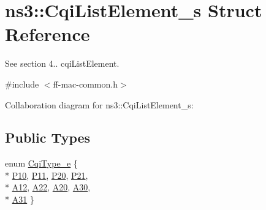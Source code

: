 \hypertarget{structns3_1_1CqiListElement__s}{}\section{ns3\+:\+:Cqi\+List\+Element\+\_\+s Struct Reference}
\label{structns3_1_1CqiListElement__s}


See section 4.. cqi\+List\+Element.  




{\ttfamily \#include $<$ff-\/mac-\/common.\+h$>$}



Collaboration diagram for ns3\+:\+:Cqi\+List\+Element\+\_\+s\+:
\subsection*{Public Types}
\begin{DoxyCompactItemize}
\item 
enum \hyperlink{structns3_1_1CqiListElement__s_a8f1bd827fd9842e7c07e39265d88299a}{Cqi\+Type\+\_\+e} \{ \\*
\hyperlink{structns3_1_1CqiListElement__s_a8f1bd827fd9842e7c07e39265d88299aa9db5a80433fbf06a4c98935e28ad26e8}{P10}, 
\hyperlink{structns3_1_1CqiListElement__s_a8f1bd827fd9842e7c07e39265d88299aafe42de09b55eb68a9ba81ee6ca45116e}{P11}, 
\hyperlink{structns3_1_1CqiListElement__s_a8f1bd827fd9842e7c07e39265d88299aad05e60a7969298f1d6f00f012e0fd799}{P20}, 
\hyperlink{structns3_1_1CqiListElement__s_a8f1bd827fd9842e7c07e39265d88299aa4dfc73319e95ad1f6cf9f1fb9c845b62}{P21}, 
\\*
\hyperlink{structns3_1_1CqiListElement__s_a8f1bd827fd9842e7c07e39265d88299aaa8e81d6ba8da30ff81103b5f3d60bf42}{A12}, 
\hyperlink{structns3_1_1CqiListElement__s_a8f1bd827fd9842e7c07e39265d88299aaa34c7d5be20ff0440824f21eef1a33b8}{A22}, 
\hyperlink{structns3_1_1CqiListElement__s_a8f1bd827fd9842e7c07e39265d88299aaca3fbaee54698b847bdf3e6f5dd60349}{A20}, 
\hyperlink{structns3_1_1CqiListElement__s_a8f1bd827fd9842e7c07e39265d88299aab9a9d64494e36c89d7932a00edb056a7}{A30}, 
\\*
\hyperlink{structns3_1_1CqiListElement__s_a8f1bd827fd9842e7c07e39265d88299aab86f27f30182e6742eb2dbd6c4a50f3d}{A31}
 \}
\end{DoxyCompactItemize}
